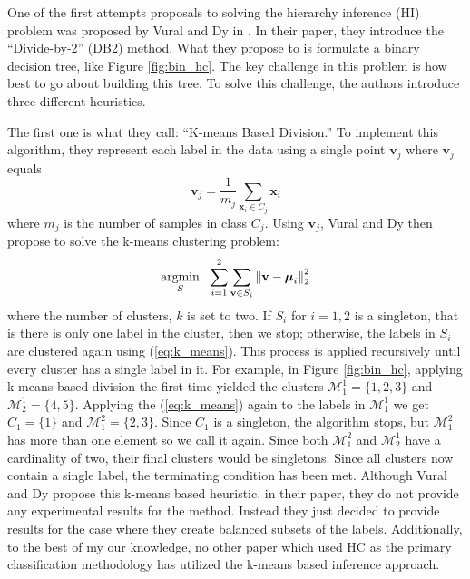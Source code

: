 \documentclass[../thesis.tex]{subfiles}
\begin{document}
One of the first attempts proposals to solving the hierarchy inference (HI)
problem was proposed by Vural and Dy in \cite{vural2004hierarchical}. In their
paper, they introduce the ``Divide-by-2'' (DB2) method. What they propose to is
formulate a binary decision tree, like Figure \ref{fig:bin_hc}. The key
challenge in this problem is how best to go about building this tree. To solve
this challenge, the authors introduce three different heuristics.

The first one is what they call: ``K-means Based Division.'' To implement this
algorithm, they represent each label in the data using a single point
$\mathbf{v}_j$ where $\mathbf{v}_j$ equals
\begin{equation}
    \label{eq:kmeans_mean}
    \mathbf{v}_j = \frac{1}{m_j} \sum_{\mathbf{x}_i \in C_j} \mathbf{x}_i
\end{equation}
where $m_j$ is the number of samples in class $C_j$. Using $\mathbf{v}_j$, Vural
and Dy then propose to solve the k-means clustering problem:
\begin{equation}
    \label{eq:k_means}
    \underset{S}{\operatorname*{argmin}} \ \ \sum_{i=1}^2 \sum_{\mathbf{v} \in S_i} \left \Vert
    \mathbf{v} - \boldsymbol{\mu}_i \right \Vert_2^2
\end{equation}
where the number of clusters, $k$ is set to two. If $S_i$ for $i = 1, 2$ is a
singleton, that is there is only one label in the cluster, then we stop;
otherwise, the labels in $S_i$ are clustered again using (\ref{eq:k_means}).
This process is applied recursively until every cluster has a single label in
it. For example, in Figure \ref{fig:bin_hc}, applying k-means based division the
first time yielded the clusters $\mathcal{M}_1^1 = \{1, 2, 3\}$ and
$\mathcal{M}_2^1 = \{4, 5\}$. Applying the (\ref{eq:k_means}) again to the
labels in $\mathcal{M}_1^1$ we get $C_1 = \{1\}$ and $\mathcal{M}_1^2 = \{2,
3\}$. Since $C_1$ is a singleton, the algorithm stops, but $\mathcal{M}_1^2$ has
more than one element so we call it again. Since both $\mathcal{M}_1^2$ and
$\mathcal{M}_2^1$ have a cardinality of two, their final clusters would be
singletons. Since all clusters now contain a single label, the terminating
condition has been met. Although Vural and Dy propose this k-means based
heuristic, in their paper, they do not provide any experimental results for the
method. Instead they just decided to provide results for the case where they
create balanced subsets of the labels. Additionally, to the best of my our
knowledge, no other paper which used HC as the primary classification
methodology has utilized the k-means based inference approach.
\end{document}
